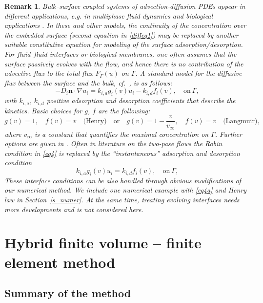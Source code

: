 \documentclass{article}
\newtheorem{remark}{Remark}[section]
\newcommand{\bn}{\mathbf n}
\begin{document}
\begin{remark}\rm Bulk--surface coupled systems of advection-diffusion PDEs appear in different applications,
e.g.  in multiphase fluid dynamics \cite{GrossReuskenBook} and biological applications \cite{bonito2011dynamics}. In these and other models, the continuity of the concentration over the embedded surface (second equation in \eqref{diffeq1}) may {be replaced by} another suitable   constitutive equation for modeling of the surface adsorption/desorption.
For fluid--fluid interfaces or biological membranes, one often assumes that the surface passively evolves with the flow, and hence there is no contribution of the advective flux to the total flux $F_\Gamma(u)$ on $\Gamma$. A standard model for the diffusive flux between the surface and the bulk, cf.~\cite{Ravera}, is as follows:
\begin{equation} \label{eq4}
-D_i \bn \cdot \nabla u_i  =  k_{i,a} g_i(v) u_i - k_{i,d} f_i(v),\quad\text{on}~\Gamma,
\end{equation}
with $k_{i,a}$, $k_{i,d}$ positive adsorption and desorption coefficients that describe the kinetics.  Basic choices for $g$, $f$ are the following:
\[
  g(v)=1, \quad f(v)=v \quad \text{(Henry)}\quad \text{or}\quad g(v)=1- \frac{v}{v_{\infty}},\quad f(v)=v \quad \text{(Langmuir)},
\]
where $v_\infty$ is a constant that quantifies the maximal concentration on $\Gamma$. Further options are given in \cite{Ravera}.
Often in literature on the two-pase flows the Robin condition in \eqref{eq4} is replaced by the ``instantaneous'' adsorption and desorption condition
\begin{equation} \label{eq4a}
k_{i,a} g_i(v) u_i = k_{i,d} f_i(v),\quad\text{on}~\Gamma,
\end{equation}
These interface conditions can be also handled through obvious modifications  of our numerical method. {We include one numerical example with \eqref{eq4a} and Henry law in Section~\ref{s_numer}.} At the same time, treating evolving interfaces needs more developments and is not considered here.
\end{remark}

\section{Hybrid finite volume -- finite element method}\label{s_hybrid}

\subsection{Summary of the method}
\end{document}
